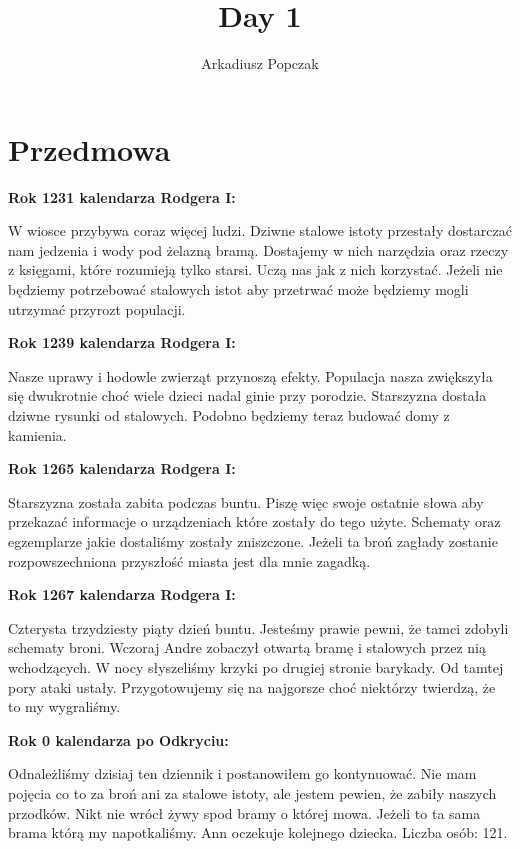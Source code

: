 \documentclass{article}
\title{\Huge{Day 1}}
\author{Arkadiusz Popczak}
\date{}
\newcommand{\textbb}[1]{
        \smallskip
        \textbf{{#1}}
        \smallskip
    }
\begin{document}
    \maketitle

    \section{Przedmowa}
    \hspace{11px}\textbb{Rok 1231 kalendarza Rodgera I:}

    W wiosce przybywa coraz więcej ludzi. Dziwne stalowe istoty przestały dostarczać nam jedzenia i wody pod żelazną bramą. Dostajemy w nich narzędzia oraz rzeczy z księgami, które rozumieją tylko starsi. Uczą nas jak z nich korzystać. Jeżeli nie będziemy potrzebować stalowych istot aby przetrwać może będziemy mogli utrzymać przyrozt populacji.

    \textbb{Rok 1239 kalendarza Rodgera I:}

    Nasze uprawy i hodowle zwierząt przynoszą efekty. Populacja nasza zwiększyła się dwukrotnie choć wiele dzieci nadal ginie przy porodzie. Starszyzna dostała dziwne rysunki od stalowych. Podobno będziemy teraz budować domy z kamienia.

    \textbb{Rok 1265 kalendarza Rodgera I:}

    Starszyzna została zabita podczas buntu. Piszę więc swoje ostatnie słowa aby przekazać informacje o urządzeniach które zostały do tego użyte. Schematy oraz egzemplarze jakie dostaliśmy zostały zniszczone. Jeżeli ta broń zagłady zostanie rozpowszechniona przyszłość miasta jest dla mnie zagadką.

    \textbb{Rok 1267 kalendarza Rodgera I:}

    Czterysta trzydziesty piąty dzień buntu. Jesteśmy prawie pewni, że tamci zdobyli schematy broni. Wczoraj Andre zobaczył otwartą bramę i stalowych przez nią wchodzących. W nocy słyszeliśmy krzyki po drugiej stronie barykady. Od tamtej pory ataki ustały. Przygotowujemy się na najgorsze choć niektórzy twierdzą, że to my wygraliśmy.

   \textbb{Rok 0 kalendarza po Odkryciu:}

   Odnależliśmy dzisiaj ten dziennik i postanowiłem go kontynuować. Nie mam pojęcia co to za broń ani za stalowe istoty, ale jestem pewien, że zabiły naszych przodków. Nikt nie wrócł żywy spod bramy o której mowa. Jeżeli to ta sama brama którą my napotkaliśmy. Ann oczekuje kolejnego dziecka. Liczba osób: 121.
\end{document}
